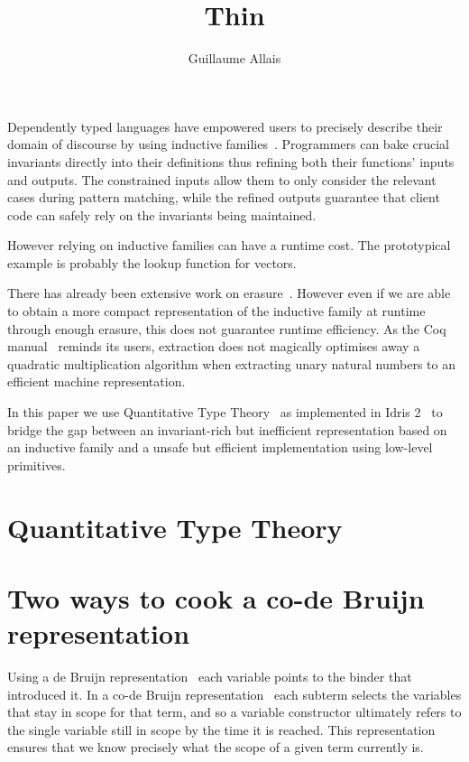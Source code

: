 \documentclass{article}
\newcommand{\idris}{Idris 2}
\begin{document}
\title{Thin}
\author{Guillaume Allais}

\maketitle

Dependently typed languages have empowered users to precisely describe their domain
of discourse by using inductive families~\cite{}.
%
Programmers can bake crucial invariants directly into their definitions thus refining
both their functions' inputs and outputs.
%
The constrained inputs allow them to only consider the relevant cases during pattern
matching, while the refined outputs guarantee that client code can safely rely on the
invariants being maintained.

However relying on inductive families can have a runtime cost. The prototypical example
is probably the lookup function for vectors.

There has already been extensive work on
erasure~\cite{DBLP:conf/types/BradyMM03,DBLP:journals/pacmpl/Tejiscak20}.
%
However even if we are able to obtain a more compact representation of the inductive
family at runtime through enough erasure, this does not guarantee runtime efficiency.
As the Coq manual~\cite{Coq:manual} reminds its users, extraction does not magically
optimises away a quadratic multiplication algorithm when extracting unary natural
numbers to an efficient machine representation.

In this paper we use Quantitative Type
Theory~\cite{DBLP:conf/birthday/McBride16,DBLP:conf/lics/Atkey18}
as implemented in \idris~\cite{DBLP:conf/ecoop/Brady21} to bridge the gap between
an invariant-rich but inefficient representation based on an inductive family and a
unsafe but efficient implementation using low-level primitives.

\section{Quantitative Type Theory}

\section{Two ways to cook a co-de Bruijn representation}

Using a de Bruijn representation~\cite{MANUAL:journals/math/debruijn72} each variable
points to the binder that introduced it. In a co-de Bruijn
representation~\cite{DBLP:journals/corr/abs-1807-04085} each subterm
selects the variables that stay in scope for that term, and so a variable constructor
ultimately refers to the single variable still in scope by the time it is reached.
%
This representation ensures that we know precisely what the scope of a given term
currently is.
\end{document}
